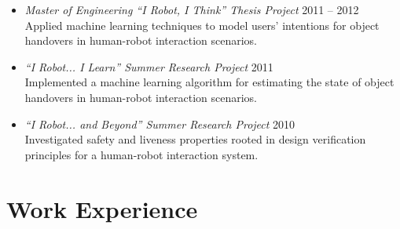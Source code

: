 \documentclass[10pt,letterpaper]{article}
\newcommand{\thing}[2]{{#1} \hfill {#2}}
\begin{document}
\begin{itemize}
	\begin{itemize}\setlength\itemsep{0.8em}\vspace{-1em}
	\item \thing{\it Master of Engineering ``I Robot, I Think'' Thesis Project}{2011 -- 2012}\vspace{0.1em}\\
	Applied machine learning techniques to model users' intentions for object handovers in human-robot interaction scenarios.
	\item \thing{\it ``I Robot... I Learn'' Summer Research Project}{2011}\vspace{-0.1em}\\
	Implemented a machine learning algorithm for estimating the state of object handovers in human-robot interaction scenarios.
	\item \thing{\it ``I Robot... and Beyond'' Summer Research Project}{2010}\vspace{-0.1em}\\
	 Investigated safety and liveness properties rooted in design verification principles for a human-robot interaction system. 
	\end{itemize}
\end{itemize}

\section{Work Experience}
\end{document}
